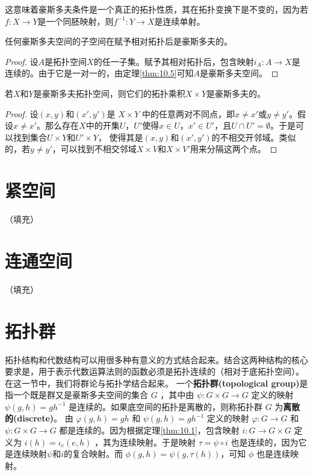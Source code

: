 \begin{theorem}
\begin{theorem}
	这意味着豪斯多夫条件是一个真正的拓扑性质，其在拓扑变换下是不变的，因为若$f:X\rightarrow Y$是一个同胚映射，则$f^{-1} :Y\rightarrow X$是连续单射。

\begin{corollary}\label{eg:10.6}
	任何豪斯多夫空间的子空间在赋予相对拓扑后是豪斯多夫的。
\end{corollary}

\begin{proof}
	设$A$是拓扑空间$X$的任一子集。赋予其相对拓扑后，包含映射$i_{A} :A\rightarrow X$是连续的。由于它是一对一的，由定理\ref{thm:10.5}可知$A$是豪斯多夫空间。
\end{proof}

\begin{theorem}\label{eg:10.7}
	若$X$和$Y$是豪斯多夫拓扑空间，则它们的拓扑乘积$X\times Y$是豪斯多夫的。
\end{theorem}

\begin{proof}
	设$(x,y)$和$(x',y')$是 $X\times Y$ 中的任意两对不同点，即$x\neq x'$或$y\neq y'$。假设$x\neq x'$。那么存在$X$中的开集$U$，$U'$使得$x\in U$，$x'\in U'$，且$U\cap U'=\emptyset $。于是可以找到集合$U\times Y$和$U'\times Y$， 使得其是$(x,y)$和$(x',y')$的不相交开邻域。类似的，若$y\neq y'$，可以找到不相交邻域$X\times V$和$X\times V'$用来分隔这两个点。
\end{proof}

\section{紧空间}
（填充）
\section{连通空间}
（填充）
\section{拓扑群}

拓扑结构和代数结构可以用很多种有意义的方式结合起来。结合这两种结构的核心要求是，用于表示代数运算法则的函数必须是拓扑连续的（相对于底拓扑空间）。在这一节中，我们将群论与拓扑学结合起来。
	一个\textbf{拓扑群(topological group)}是指一个既是群又是豪斯多夫空间的集合 $ G$ ，其中由 $\psi :G\times G\rightarrow G$ 定义的映射 $\psi (g,h)=gh^{-1}$ 是连续的。如果底空间的拓扑是离散的，则称拓扑群 $G$ 为\textbf{离散的(discrete)}。
	由 $\varphi (g,h)=gh$ 和 $\psi (g,h)=gh^{-1}$ 定义的映射 $\varphi :G\rightarrow G$ 和 $\psi :G\times G\rightarrow G$ 都是连续的。因为根据定理\ref{thm:10.1}，包含映射 $i:G\rightarrow G\times G$ 定义为 $i(h)=\iota _{e} (e,h)$ ，其为连续映射。于是映射 $\tau =\psi \circ i$ 也是连续的，因为它是连续映射$ \psi $和$ i$的复合映射。而 $\phi ( g,h) =\psi (g,\tau (h))$，可知 $\phi $ 也是连续映射。


\end{theorem}
\end{theorem}
